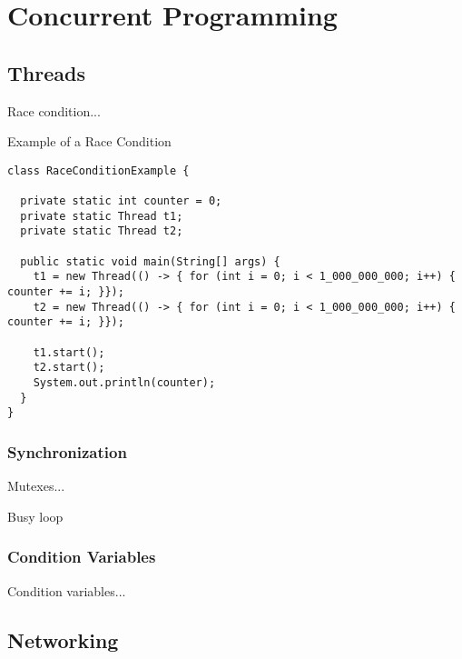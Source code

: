 \section{Concurrent Programming}

\subsection*{Threads}

\example Race condition...

\begin{cl}{Example of a Race Condition}
\begin{lstlisting}[language=MyJava]
class RaceConditionExample {

  private static int counter = 0;
  private static Thread t1;
  private static Thread t2;

  public static void main(String[] args) {
    t1 = new Thread(() -> { for (int i = 0; i < 1_000_000_000; i++) { counter += i; }});
    t2 = new Thread(() -> { for (int i = 0; i < 1_000_000_000; i++) { counter += i; }});

    t1.start();
    t2.start();
    System.out.println(counter);
  }
}
\end{lstlisting}
\end{cl}


\subsubsection*{Synchronization}

\example Mutexes...

\example Busy loop

\subsubsection*{Condition Variables}

\example Condition variables...

\subsection*{Networking}

